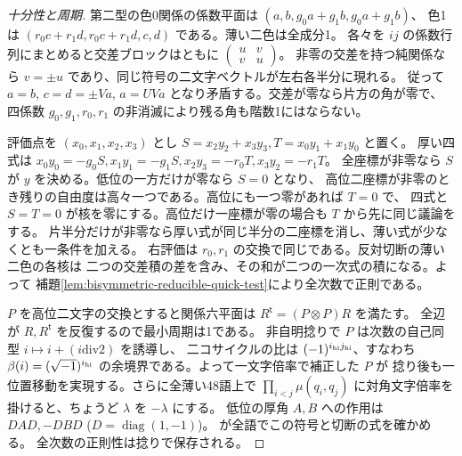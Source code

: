 \begin{proof}[十分性と周期]
第二型の色0関係の係数平面は $(a,b,g_0a+g_1b,g_0a+g_1b)$、
色1は $(r_0c+r_1d,r_0c+r_1d,c,d)$ である。薄い二色は全成分1。
各々を $ij$ の係数行列にまとめると交差ブロックはともに
$\left(\begin{smallmatrix}u&v\\v&u\end{smallmatrix}\right)$。
非零の交差を持つ純関係なら $v=\pm u$ であり、同じ符号の二文字ベクトルが左右各半分に現れる。
従って $a=b$, $c=d=\pm Va$, $a=UVa$ となり矛盾する。交差が零なら片方の角が零で、
四係数 $g_0,g_1,r_0,r_1$ の非消滅により残る角も階数1にはならない。

評価点を $(x_0,x_1,x_2,x_3)$ とし $S=x_2y_2+x_3y_3,T=x_0y_1+x_1y_0$ と置く。
厚い四式は $x_0y_0=-g_0S,x_1y_1=-g_1S,x_2y_3=-r_0T,x_3y_2=-r_1T$。
全座標が非零なら $S$ が $y$ を決める。低位の一方だけが零なら $S=0$ となり、
高位二座標が非零のとき残りの自由度は高々一つである。高位にも一つ零があれば $T=0$ で、
四式と $S=T=0$ が核を零にする。高位だけ一座標が零の場合も $T$ から先に同じ議論をする。
片半分だけが非零なら厚い式が同じ半分の二座標を消し、薄い式が少なくとも一条件を加える。
右評価は $r_0,r_1$ の交換で同じである。反対切断の薄い二色の各核は
二つの交差積の差を含み、その和が二つの一次式の積になる。よって
補題\ref{lem:bisymmetric-reducible-quick-test}により全次数で正則である。

$P$ を高位二文字の交換とすると関係六平面は $R^{\mathsf t}=(P\otimes P)R$ を満たす。
全辺が $R,R^{\mathsf t}$ を反復するので最小周期は1である。
非自明捻りで $P$ は次数の自己同型 $i\mapsto i+(i\mathbin{\mathrm{div}}2)$ を誘導し、
二コサイクルの比は $(-1)^{i_{\rm hi}j_{\rm hi}}$、すなわち
$\beta(i)=(\sqrt{-1})^{i_{\rm hi}}$ の余境界である。よって一文字倍率で補正した $P$ が
捻り後も一位置移動を実現する。さらに全薄い48語上で
$\prod_{i<j}\mu(q_i,q_j)$ に対角文字倍率を掛けると、ちょうど $\lambda$ を $-\lambda$ にする。
低位の厚角 $A,B$ への作用は $DAD,-DBD$ ($D=\operatorname{diag}(1,-1)$)。
 が全語でこの符号と切断の式を確かめる。
全次数の正則性は捻りで保存される。
\end{proof}

